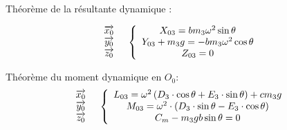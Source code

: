 \documentclass[10pt,fleqn]{article} %
\begin{document}
\begin{multicols}{2}
Théorème de la résultante dynamique : 

$$
\begin{array}{cc}
\begin{array}{c}
\overrightarrow{x_0}\\
\overrightarrow{y_0}\\
\overrightarrow{z_0}
\end{array}
&
\left\{
\begin{array}{c}
X_{03}=b m_3 \omega^2\sin\theta\\
Y_{03}+m_3 g=-b m_3 \omega^2\cos\theta\\
Z_{03}=0
\end{array}
\right.
\end{array}
$$

Théorème du moment dynamique en $O_0$: 
$$
\begin{array}{cc}
\begin{array}{c}
\overrightarrow{x_0}\\
\overrightarrow{y_0}\\
\overrightarrow{z_0}
\end{array}
&
\left\{
\begin{array}{c}
L_{03}=\omega^2 \left(D_3\cdot\cos\theta+E_3\cdot\sin\theta\right)+c m_3 g\\
M_{03}=\omega^2\cdot\left(D_3\cdot\sin\theta-E_3\cdot\cos\theta\right)\\
C_m-m_3 g b\sin\theta=0
\end{array}
\right.
\end{array}
$$
\end{multicols}

\end{document}
